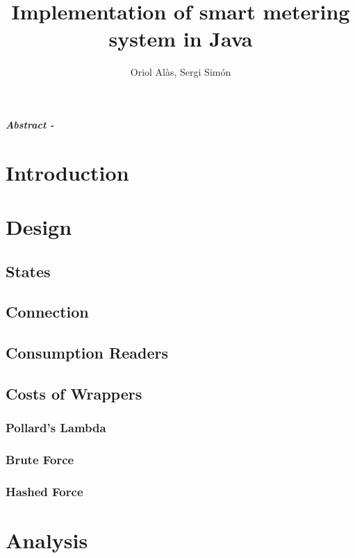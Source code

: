\documentclass{article}
\title{Implementation of smart metering system in Java}
\author{Oriol Alàs, Sergi Simón}
\begin{document}
   \maketitle
   
   \textbf{\textit{Abstract - }}
   \section{Introduction}
   
   \section{Design}
   
   \subsection{States}
   
   \subsection{Connection}
   
   \subsection{Consumption Readers}
   
   \subsection{Costs of Wrappers}
   \label{wrapp:sec}
   \subsubsection{Pollard's Lambda}
   \subsubsection{Brute Force}
   \subsubsection{Hashed Force}
   \section{Analysis}
   
\end{document}
